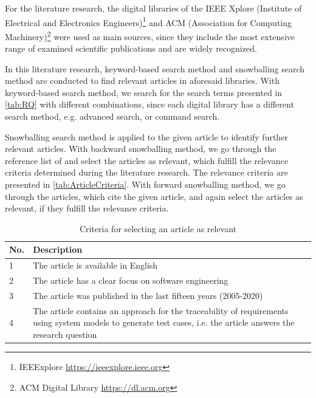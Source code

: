 For the literature research, the digital libraries of the IEEE Xplore (Institute of Electrical and Electronics Engineers)\footnote{IEEExplore \url{https://ieeexplore.ieee.org}} and ACM (Association for Computing Machinery)\footnote{ACM Digital Library \url{https://dl.acm.org}} were used as main sources, since they include the most extensive range of examined scientific publications and are widely recognized. 

In this literature research, keyword-based search method and snowballing search method are conducted to find relevant articles in aforesaid libraries. With keyword-based search method, we search for the search terms presented in \autoref{tab:RQ} with different combinations, since each digital library has a different search method, e.g.  advanced search, or command search.

Snowballing search method is applied to the given article \cite{Paper1} to identify further relevant articles. With backward snowballing method, we go through the reference list of \cite{Paper1} and select the articles as relevant, which fulfill the relevance criteria determined during the literature research. The relevance criteria are presented in \autoref{tab:ArticleCriteria}. With forward snowballing method, we go through the articles, which cite the given article, and again select the articles as relevant, if they fulfill the relevance criteria.


\begin{table} [htb] 
\centering
\begin{small}
\caption{Criteria for selecting an article as relevant}
\label{tab:ArticleCriteria}
\setlength{\tabcolsep}{1em}
\begin{tabular}{ l| p{12cm}}
\hline
\textbf{No.} & \textbf{Description} \\
\hline
1 & The article is available in English\\
\hline
2  & The article has a clear focus on software engineering\\
\hline
3  & The article was published in the last fifteen years (2005-2020) \\
\hline
4  &  The article contains an approach for the traceability of requirements using system models to generate test cases, i.e. the article answers the research question\\
\hline
\end{tabular}
\end{small}
\end{table}

